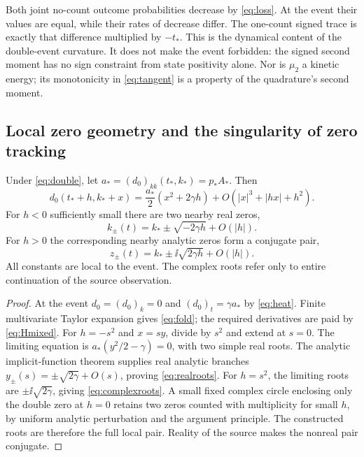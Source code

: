 Both joint no-count outcome probabilities decrease by \eqref{eq:loss}.
At the event their values are equal, while their rates of decrease differ.
The one-count signed trace is exactly that difference multiplied by $-t_*$.
This is the dynamical content of the double-event curvature. It does not
make the event forbidden: the signed second moment has no sign constraint
from state positivity alone. Nor is $\mu_2$ a kinetic energy; its monotonicity
in \eqref{eq:tangent} is a property of the quadrature's second moment.

\subsection{Local zero geometry and the singularity of zero tracking}
\begin{theorem}\label{thm:fold}
Under \eqref{eq:double}, let $a_*=(d_0)_{kk}(t_*,k_*)=p_*A_*$. Then
\begin{equation}\label{eq:fold}
 d_0(t_*+h,k_*+x)
 =\frac{a_*}{2}(x^2+2\gamma h)+O(|x|^3+|hx|+h^2).
\end{equation}
For $h<0$ sufficiently small there are two nearby real zeros,
\begin{equation}\label{eq:realroots}
 k_\pm(t)=k_*\pm\sqrt{-2\gamma h}+O(|h|).
\end{equation}
For $h>0$ the corresponding nearby analytic zeros form a conjugate pair,
\begin{equation}\label{eq:complexroots}
 z_\pm(t)=k_*\pm\ii\sqrt{2\gamma h}+O(|h|).
\end{equation}
All constants are local to the event. The complex roots refer only to
entire continuation of the source observation.
\end{theorem}
\begin{proof}
At the event $d_0=(d_0)_k=0$ and $(d_0)_t=\gamma a_*$ by
\eqref{eq:heat}. Finite multivariate Taylor expansion gives \eqref{eq:fold};
the required derivatives are paid by \eqref{eq:Hmixed}.
For $h=-s^2$ and $x=sy$, divide by $s^2$ and extend at $s=0$.
The limiting equation is $a_*(y^2/2-\gamma)=0$, with two simple real
roots. The analytic implicit-function theorem supplies real analytic
branches $y_\pm(s)=\pm\sqrt{2\gamma}+O(s)$, proving
\eqref{eq:realroots}. For $h=s^2$, the limiting roots are
$\pm\ii\sqrt{2\gamma}$, giving \eqref{eq:complexroots}.
A small fixed complex circle enclosing only the double zero at $h=0$
retains two zeros counted with multiplicity for small $h$, by uniform
analytic perturbation and the argument principle. The constructed roots
are therefore the full local pair. Reality of the source makes the
nonreal pair conjugate.
\end{proof}

